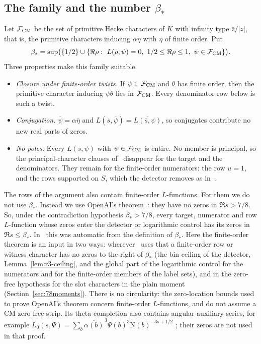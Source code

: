 \documentclass[11pt]{article}
\numberwithin{equation}{section}
\newcommand{\N}{\mathrm N}
\begin{document}
\subsection{The family and the number \texorpdfstring{$\beta_*$}{beta*}}
Let $\mathcal F_{\rm CM}$ be the set of primitive Hecke characters of $K$ with infinity type
$\bar z/|z|$, that is, the primitive characters inducing $\overline\alpha\eta$ with $\eta$ of finite
order. Put
\begin{equation}\label{eq:d074}
 \beta_*=\sup\bigl(\{1/2\}\cup\{\Re\rho:\ L(\rho,\psi)=0,\ 1/2\le\Re\rho\le1,\
 \psi\in\mathcal F_{\rm CM}\}\bigr).
\end{equation}
Three properties make this family suitable.
\begin{itemize}
\item \emph{Closure under finite-order twists.} If $\psi\in\mathcal F_{\rm CM}$ and $\theta$
 has finite order, then the primitive character inducing $\psi\theta$ lies in
 $\mathcal F_{\rm CM}$. Every denominator row below is such a twist.
\item \emph{Conjugation.} $\overline\psi=\alpha\bar\eta$ and
 $L(s,\overline\psi)=\overline{L(\bar s,\psi)}$, so conjugates contribute no new real parts
 of zeros.
\item \emph{No poles.} Every $L(s,\psi)$ with $\psi\in\mathcal F_{\rm CM}$ is entire. No
 member is principal, so the principal-character clauses of~\cite{OAI78} disappear for the target and
 the denominators. They remain for the finite-order numerators: the row $u=1$, and the rows supported
 on $S$, which the detector removes as in~\cite[Section~8.1]{OAI78}.
\end{itemize}
The rows of the argument also contain finite-order $L$-functions. For them we do
not use $\beta_*$. Instead we use OpenAI's theorem~\cite[Theorem~1.1]{OAI78}:
they have no zeros in $\Re s>7/8$. So, under the contradiction hypothesis
$\beta_*>7/8$, every target, numerator and row $L$-function whose zeros enter the
detector or logarithmic control has its zeros in $\Re s\le\beta_*$.
In~\cite{OAI78} this was automatic from the definition of $\beta_*$. Here the finite-order theorem is an
input in two ways: wherever~\cite{OAI78} uses that a finite-order row or witness character has no zeros to
the right of $\beta_*$ (the bin ceiling of the detector, Lemma~\ref{lem:r3-ceiling}, and the global part of the
logarithmic control for the numerators and for the finite-order members of the label sets), and in the zero-free
hypothesis for the slot characters in the plain moment (Section~\ref{sec:78moments}).
There is no circularity: the zero-location bounds used to prove OpenAI's theorem
concern finite-order $L$-functions, and do not assume a CM zero-free strip.
Its theta completion also contains angular auxiliary series, for example
$L_0(s,\Psi)=\sum_b\overline{\alpha(b)}^{\,3}\Psi(b)^3\N(b)^{-3s+1/2}$
\cite[Proposition~5.1]{OAI78}; their zeros are not used in that proof.
\end{document}
